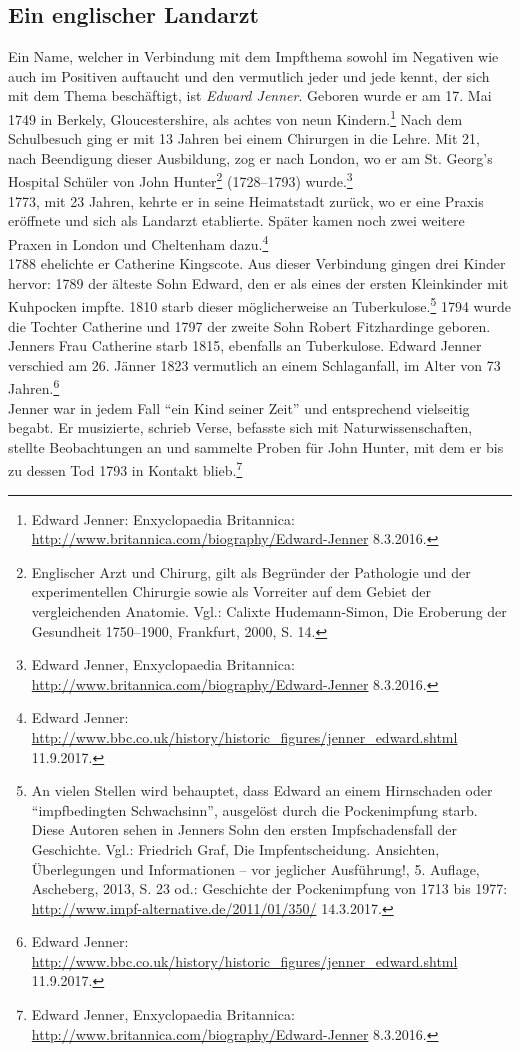 \documentclass[
    a4paper,
    12pt,
    hyphens,
    chapterprefix=true,
    headheight=33pt,
    footheight=29pt,
    headings=optiontohead, %
]{scrartcl}
\begin{document}
\subsection{Ein englischer Landarzt}
Ein Name, welcher in Verbindung mit dem Impfthema sowohl im Negativen wie auch im Positiven auftaucht und den vermutlich jeder und jede kennt, der sich mit dem Thema beschäftigt, ist \textit{Edward Jenner}.
Geboren wurde er am 17. Mai 1749 in Berkely, Gloucestershire, als achtes von neun Kindern.\footnote{Edward Jenner:  Enxyclopaedia Britannica: \url{http://www.britannica.com/biography/Edward-Jenner} 8.3.2016.} Nach dem Schulbesuch ging er mit 13 Jahren bei einem Chirurgen in die Lehre. Mit 21, nach Beendigung dieser Ausbildung, zog er nach London, wo er am St. Georg's Hospital Schüler von John Hunter\footnote{Englischer Arzt und Chirurg, gilt als Begründer der Pathologie und der experimentellen Chirurgie sowie als Vorreiter auf dem Gebiet der vergleichenden Anatomie. Vgl.: Calixte Hudemann-Simon, Die Eroberung der Gesundheit 1750--1900, Frankfurt, 2000, S. 14.} (1728--1793) wurde.\footnote{Edward Jenner, Enxyclopaedia Britannica: \url{http://www.britannica.com/biography/Edward-Jenner} 8.3.2016.}\\
1773, mit 23 Jahren, kehrte er in seine Heimatstadt zurück, wo er eine Praxis eröffnete und sich als Landarzt etablierte. Später kamen noch zwei weitere Praxen in London und Cheltenham dazu.\footnote{Edward Jenner: \url{http://www.bbc.co.uk/history/historic_figures/jenner_edward.shtml} 11.9.2017.}\\
1788 ehelichte er Catherine Kingscote. Aus dieser Verbindung gingen drei Kinder hervor: 1789 der älteste Sohn Edward, den er als eines der ersten Kleinkinder mit Kuhpocken impfte. 1810 starb dieser möglicherweise an Tuberkulose.\footnote{An vielen Stellen wird behauptet, dass Edward an einem Hirnschaden oder "`impfbedingten Schwachsinn"', ausgelöst durch die Pockenimpfung starb. Diese Autoren sehen in Jenners Sohn den ersten Impfschadensfall der Geschichte. Vgl.: Friedrich Graf, Die Impfentscheidung. Ansichten, Überlegungen und Informationen -- vor jeglicher Ausführung!, 5. Auflage, Ascheberg, 2013, S. 23 od.: Geschichte der Pockenimpfung von 1713 bis 1977: \url{http://www.impf-alternative.de/2011/01/350/} 14.3.2017.} 1794 wurde die Tochter Catherine und 1797 der zweite Sohn Robert Fitzhardinge geboren. Jenners Frau Catherine starb 1815, ebenfalls an Tuberkulose. Edward Jenner verschied am 26. Jänner 1823 vermutlich an einem Schlaganfall, im Alter von 73 Jahren.\footnote{Edward Jenner: \url{http://www.bbc.co.uk/history/historic\_figures/jenner\_edward.shtml} 11.9.2017.}\\
Jenner war in jedem Fall "`ein Kind seiner Zeit"' und entsprechend vielseitig begabt. Er musizierte, schrieb Verse, befasste sich mit Naturwissenschaften, stellte Beobachtungen an und sammelte Proben für John Hunter, mit dem er bis zu dessen Tod 1793 in Kontakt blieb.\footnote{Edward Jenner, Enxyclopaedia Britannica: \url{http://www.britannica.com/biography/Edward-Jenner} 8.3.2016.}\\
\end{document}
